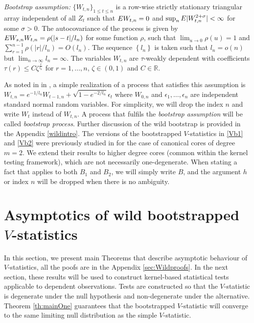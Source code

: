 \emph{Bootstrap assumption:} $\{W_{t,n}\}_{1 \leq t \leq n }$ is a row-wise strictly stationary triangular array independent of all $Z_t$ such that $E W_{t,n}=0$ and $\sup_{n} E|W_{t,n}^{2+\sigma}| < \infty$ for some $\sigma > 0$. The autocovariance of the process is given by $E W_{s,n} W_{t,n}=\rho(|s-t|/l_n)$ for some function $\rho$, such that $\lim_{u \to 0} \rho(u) = 1$ and $\sum_{r=1}^{n-1} \rho(|r|/l_n)= O(l_n)$. The sequence $\left\{l_n\right\}$ is taken such that $l_n=o(n)$ but $\lim_{n \to \infty} l_n = \infty$. The variables $W_{t,n}$  are $\tau$-weakly dependent with coefficients $\tau(r) \leq C \zeta^{\frac{r} {l_n}}$ for $r=1,...,n$, $\zeta \in (0,1)$ and $C\in\mathbb R$.

As noted in in \cite[Remark 2]{leucht_dependent_2013}, a simple realization of a process that satisfies this assumption is $W_{t,n} = e^{-1/l_n}W_{t-1,n} + \sqrt{1 -e^{-2/l_n}} \epsilon_t$
where $W_{0,n}$ and $\epsilon_1,\ldots,\epsilon_n$ are independent standard normal random variables. For simplicity, we will drop the index $n$ and write $W_t$ instead of $W_{t,n}$. A process that fulfils the \emph{bootstrap assumption} will be called  \emph{bootstrap process}. Further discussion of the wild bootstrap is provided in the Appendix  \ref{wildintro}.
The versions of the bootstrapped $V$-statistics in \eqref{Vb1} and \eqref{Vb2} were previously studied in \cite{leucht_dependent_2013} for the case of canonical cores of degree $m=2$. We extend their results to higher degree cores (common within the kernel testing framework), which are not necessarily one-degenerate. When stating a fact that applies to both $B_1$ and $B_2$, we will simply write $B$, and the argument $h$ or index $n$ will be dropped when there is no ambiguity. 
\section{Asymptotics of wild bootstrapped $V$-statistics}\label{sec:main}
In this section, we present main Theorems that describe asymptotic behaviour of $V$-statistics, all the poofs are in the Appendix \ref{sec:Wildproofs}.  In the next section, these results will be used to construct kernel-based statistical tests applicable to dependent observations. Tests are constructed so that the  $V$-statistic is degenerate under the null hypothesis and non-degenerate under the alternative. Theorem \ref{th:mainOne} guarantees that the bootstrapped $V$-statistic will converge to the same limiting null distribution as the simple $V$-statistic. 


